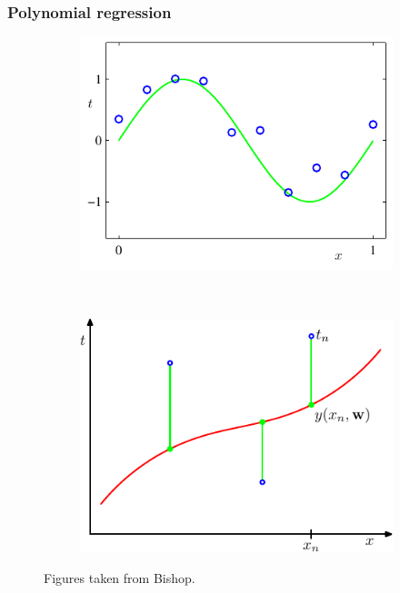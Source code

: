 \subsubsection{Polynomial regression}
\begin{figure}
	\centering
	\begin{subfigure}[b]{0.45\textwidth}
                \centering
                \includegraphics[width=\textwidth]{./lecture1/Figure1_2}
    \end{subfigure}%
	~
	\begin{subfigure}[b]{0.45\textwidth}
                \centering
                \includegraphics[width=\textwidth]{./lecture1/Figure1_3}
    \end{subfigure}%
	\caption{Figures taken from Bishop.}
\end{figure}

